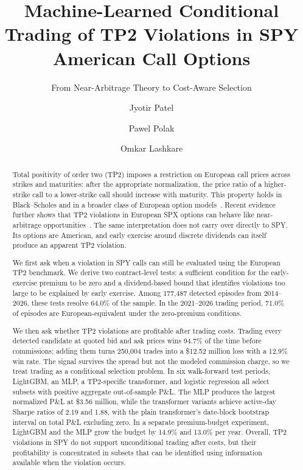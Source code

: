 \documentclass[sigconf]{acmart}
\begin{document}
\title{Machine-Learned Conditional Trading of TP2 Violations in SPY American Call Options}
\subtitle{From Near-Arbitrage Theory to Cost-Aware Selection}

\author{Jyotir Patel}

\author{Pawel Polak}

\author{Omkar Lashkare}

\renewcommand{\shortauthors}{Patel, Polak, and Lashkare}

\begin{abstract}
Total positivity of order two (TP2) imposes a restriction on European call prices across strikes and maturities: after the appropriate normalization, the price ratio of a higher-strike call to a lower-strike call should increase with maturity. This property holds in Black--Scholes and in a broader class of European option models~\cite{glasserman2026tp2theory}. Recent evidence further shows that TP2 violations in European SPX options can behave like near-arbitrage opportunities~\cite{glasserman2025tp2}. The same interpretation does not carry over directly to SPY. Its options are American, and early exercise around discrete dividends can itself produce an apparent TP2 violation.

We first ask when a violation in SPY calls can still be evaluated using the European TP2 benchmark. We derive two contract-level tests: a sufficient condition for the early-exercise premium to be zero and a dividend-based bound that identifies violations too large to be explained by early exercise. Among 177{,}487 detected episodes from 2014--2026, these tests resolve 64.0\% of the sample. In the 2021--2026 trading period, 71.0\% of episodes are European-equivalent under the zero-premium conditions.

We then ask whether TP2 violations are profitable after trading costs. Trading every detected candidate at quoted bid and ask prices wins 94.7\% of the time before commissions; adding them turns 250{,}004 trades into a \$12.52 million loss with a 12.9\% win rate. The signal survives the spread but not the modeled commission charge, so we treat trading as a conditional selection problem. In six walk-forward test periods, LightGBM, an MLP, a TP2-specific transformer, and logistic regression all select subsets with positive aggregate out-of-sample P\&L. The MLP produces the largest normalized P\&L at \$3.56 million, while the transformer variants achieve active-day Sharpe ratios of 2.19 and 1.88, with the plain transformer's date-block bootstrap interval on total P\&L excluding zero. In a separate premium-budget experiment, LightGBM and the MLP grow the budget by 14.9\% and 13.0\% per year. Overall, TP2 violations in SPY do not support unconditional trading after costs, but their profitability is concentrated in subsets that can be identified using information available when the violation occurs.
\end{abstract}
\end{document}
